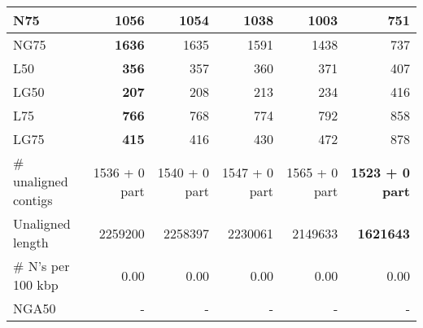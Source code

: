 \documentclass[12pt,a4paper]{article}
\begin{document}
\begin{table}[ht]
\begin{center}
\begin{tabular}{|l*{5}{|r}|}
N75 & {\bf 1056} & 1054 & 1038 & 1003 & 751 \\ \hline
NG75 & {\bf 1636} & 1635 & 1591 & 1438 & 737 \\ \hline
L50 & {\bf 356} & 357 & 360 & 371 & 407 \\ \hline
LG50 & {\bf 207} & 208 & 213 & 234 & 416 \\ \hline
L75 & {\bf 766} & 768 & 774 & 792 & 858 \\ \hline
LG75 & {\bf 415} & 416 & 430 & 472 & 878 \\ \hline
\# unaligned contigs & 1536 + 0 part & 1540 + 0 part & 1547 + 0 part & 1565 + 0 part & {\bf 1523 + 0 part} \\ \hline
Unaligned length & 2259200 & 2258397 & 2230061 & 2149633 & {\bf 1621643} \\ \hline
\# N's per 100 kbp & 0.00 & 0.00 & 0.00 & 0.00 & 0.00 \\ \hline
NGA50 & - & - & - & - & - \\ \hline
\end{tabular}
\end{center}
\end{table}
\end{document}
